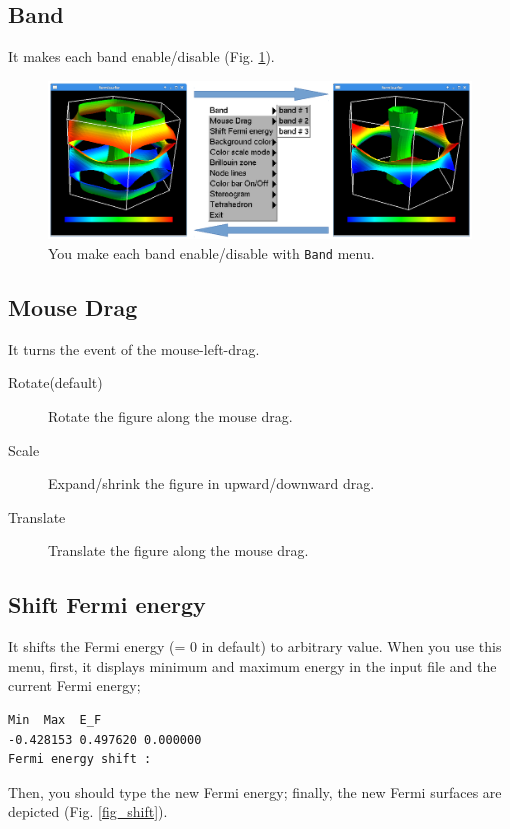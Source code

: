 \documentclass[12pt]{article}
\begin{document}
\subsection{Band}

It makes each band enable/disable (Fig. \ref{fig_band}).

\begin{figure}[!ht]
  \includegraphics[width=17cm]{figs/band.eps}
  \caption{You make each band enable/disable with \texttt{Band} menu.}
  \label{fig_band}
\end{figure}

\subsection{Mouse Drag}

It turns the event of the mouse-left-drag.

\begin{description}
\item[Rotate(default)] Rotate the figure along the mouse drag.
\item[Scale] Expand/shrink the figure in upward/downward drag.
\item[Translate] Translate the figure along the mouse drag.
\end{description}

\subsection{Shift Fermi energy}

It shifts the Fermi energy (= 0 in default) to arbitrary value.
When you use this menu, 
first, it displays minimum and maximum energy in the input file
and the current Fermi energy;
\begin{verbatim}
Min  Max  E_F 
-0.428153 0.497620 0.000000 
Fermi energy shift : 
\end{verbatim}
Then, you should type the new Fermi energy;
finally, the new Fermi surfaces are depicted (Fig. \ref{fig_shift}).
\end{document}
